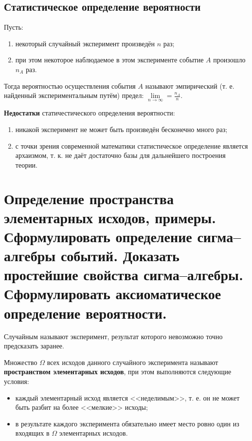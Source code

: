 \subsection*{Статистическое определение вероятности}

Пусть:
\begin{enumerate}[label=\arabic*)]
	\item некоторый случайный эксперимент произведён $n$ раз;
	\item при этом некоторое наблюдаемое в этом эксперименте событие $A$ произошло $n_A$ раз.
\end{enumerate}

Тогда вероятностью осуществления события $A$ называют эмпирический (т. е. найденный экспериментальным путём) предел: $\lim\limits_{n \rightarrow \infty} = \frac{n_A}{n}$.

\textbf{Недостатки} статичестического определения вероятности: 
\begin{enumerate}[label=\arabic*)]
	\item никакой эксперимент не может быть произведён бесконечно много раз;
	\item с точки зрения современной математики статистическое определение является архаизмом, т. к. не даёт достаточно базы для дальнейшего построения теории.
\end{enumerate}

\section{Определение пространства элементарных исходов, примеры. Сформулировать определение сигма--алгебры событий. Доказать простейшие свойства сигма--алгебры. Сформулировать аксиоматическое определение вероятности.}

Случайным называют эксперимент, результат которого невозможно точно предсказать заранее.

Множество $\Omega$ всех исходов данного случайного эксперимента называют \textbf{пространством элементарных исходов}, при этом выполняются следующие условия: 

\begin{itemize}
	\item каждый элементарный исход является <<неделимым>>, т. е. он не может быть разбит на более <<мелкие>> исходы;
	
	\item в результате каждого эксперимента обязательно имеет место ровно один из входящих в $\Omega$ элементарных исходов.
\end{itemize}

